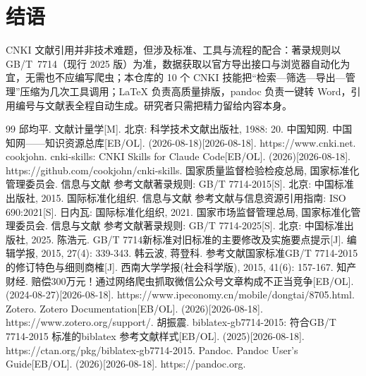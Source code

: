 \documentclass[UTF8, zihao=-4, fontset=fandol]{ctexart}
\begin{document}
\section{结语}

CNKI 文献引用并非技术难题，但涉及标准、工具与流程的配合：著录规则以 GB/T~7714（现行 2025 版）为准，数据获取以官方导出接口与浏览器自动化为宜，无需也不应编写爬虫；本仓库的 10 个 CNKI 技能把“检索—筛选—导出—管理”压缩为几次工具调用；LaTeX 负责高质量排版，pandoc 负责一键转 Word，引用编号与文献表全程自动生成。研究者只需把精力留给内容本身。

\begin{thebibliography}{99}
 邱均平. 文献计量学[M]. 北京: 科学技术文献出版社, 1988: 20.
 中国知网. 中国知网——知识资源总库[EB/OL]. (2026-08-18)[2026-08-18]. https://www.cnki.net.
 cookjohn. cnki-skills: CNKI Skills for Claude Code[EB/OL]. (2026)[2026-08-18]. https://github.com/cookjohn/cnki-skills.
 国家质量监督检验检疫总局, 国家标准化管理委员会. 信息与文献 参考文献著录规则: GB/T 7714-2015[S]. 北京: 中国标准出版社, 2015.
 国际标准化组织. 信息与文献 参考文献与信息资源引用指南: ISO 690:2021[S]. 日内瓦: 国际标准化组织, 2021.
 国家市场监督管理总局, 国家标准化管理委员会. 信息与文献 参考文献著录规则: GB/T 7714-2025[S]. 北京: 中国标准出版社, 2025.
 陈浩元. GB/T 7714新标准对旧标准的主要修改及实施要点提示[J]. 编辑学报, 2015, 27(4): 339-343.
 韩云波, 蒋登科. 参考文献国家标准GB/T 7714-2015的修订特色与细则商榷[J]. 西南大学学报(社会科学版), 2015, 41(6): 157-167.
 知产财经. 赔偿300万元！通过网络爬虫抓取微信公众号文章构成不正当竞争[EB/OL]. (2024-08-27)[2026-08-18]. https://www.ipeconomy.cn/mobile/dongtai/8705.html.
 Zotero. Zotero Documentation[EB/OL]. (2026)[2026-08-18]. https://www.zotero.org/support/.
 胡振震. biblatex-gb7714-2015: 符合GB/T 7714-2015 标准的biblatex 参考文献样式[EB/OL]. (2025)[2026-08-18]. https://ctan.org/pkg/biblatex-gb7714-2015.
 Pandoc. Pandoc User's Guide[EB/OL]. (2026)[2026-08-18]. https://pandoc.org.
\end{thebibliography}
\end{document}
